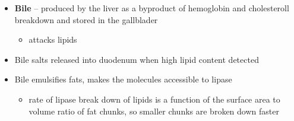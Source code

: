 \documentclass{article}
\theoremstyle{definition}
\begin{document}
\begin{itemize}
		\begin{itemize}
			\item \textbf{Bile} -- produced by the liver as a byproduct of hemoglobin and cholesteroll breakdown and stored in the gallblader
				\begin{itemize}
					\item attacks lipids
				\end{itemize}
			\item Bile salts released into duodenum when high lipid content detected
			\item Bile emulsifies fats, makes the molecules accessible to lipase
				\begin{itemize}
					\item rate of lipase break down of lipids is a function of the surface area to volume ratio of fat chunks, so smaller chunks are broken down faster
				\end{itemize}
		\end{itemize}
\end{itemize}
							
\end{document}
